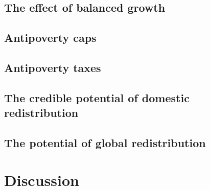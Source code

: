 \subsection{The effect of balanced growth}

\subsection{Antipoverty caps}

\subsection{Antipoverty taxes}

\subsection{The credible potential of domestic redistribution}

\subsection{The potential of global redistribution}


\section{Discussion} 

